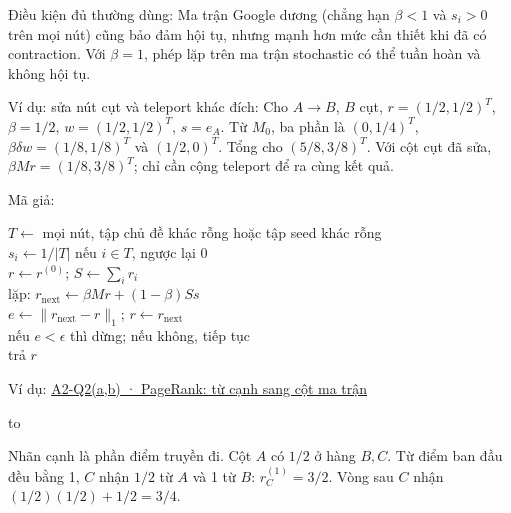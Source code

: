 \documentclass[10pt,a4paper,twocolumn]{article}
\makeatletter
\newcommand{\key}[1]{#1:\enspace}
\newcommand{\blocklabel}[1]{\par\noindent#1\par\nobreak}
\newcommand{\qlink}[2]{\hyperref[question:#1]{#2}}
\newenvironment{example}[2]{%
  \par\addvspace{6pt}\noindent
  \raggedright
  \blocklabel{Ví dụ: \qlink{#1}{#2}}%
}{\par\addvspace{4pt}}
\newenvironment{diagram}{%
  \par\addvspace{3pt}\noindent\hbox to \linewidth\bgroup\hfil
}{\hfil\egroup\par\addvspace{3pt}}
\newenvironment{algpseudo}{%
  \par\addvspace{2pt}\noindent
  \setlength{\parskip}{0pt}%
  Mã giả:\par\nobreak
  \begin{list}{}{\setlength{\leftmargin}{1em}\setlength{\topsep}{0pt}%
    \setlength{\partopsep}{0pt}\setlength{\parsep}{0pt}%
    \@beginparpenalty=10000\relax}%
  \item\relax
}{\end{list}\par\addvspace{3pt}}
\makeatother
\begin{document}
\key{Điều kiện đủ thường dùng} Ma trận Google dương (chẳng hạn $\beta<1$ và $s_i>0$ trên mọi nút) cũng bảo đảm hội tụ, nhưng mạnh hơn mức cần thiết khi đã có contraction. Với $\beta=1$, phép lặp trên ma trận stochastic có thể tuần hoàn và không hội tụ.

\key{Ví dụ: sửa nút cụt và teleport khác đích} Cho $A\to B$, $B$ cụt, $r=(1/2,1/2)^T$, $\beta=1/2$, $w=(1/2,1/2)^T$, $s=e_A$. Từ $M_0$, ba phần là $(0,1/4)^T$, $\beta\delta w=(1/8,1/8)^T$ và $(1/2,0)^T$. Tổng cho $(5/8,3/8)^T$. Với cột cụt đã sửa, $\beta Mr=(1/8,3/8)^T$; chỉ cần cộng teleport để ra cùng kết quả.

\begin{algpseudo}
$T\gets$ mọi nút, tập chủ đề khác rỗng hoặc tập seed khác rỗng\\
$s_i\gets1/|T|$ nếu $i\in T$, ngược lại $0$\\
$r\gets r^{(0)}$; $S\gets\sum_i r_i$\\
lặp: $r_{\mathrm{next}}\gets\beta Mr+(1-\beta)S s$\\
$e\gets\|r_{\mathrm{next}}-r\|_1$; $r\gets r_{\mathrm{next}}$\\
nếu $e<\epsilon$ thì dừng; nếu không, tiếp tục\\
trả $r$
\end{algpseudo}

\begin{example}{A2-Q2}{A2-Q2(a,b) · PageRank: từ cạnh sang cột ma trận}
\begin{diagram}
\end{diagram}
Nhãn cạnh là phần điểm truyền đi. Cột $A$ có $1/2$ ở hàng $B,C$. Từ điểm ban đầu đều bằng 1, $C$ nhận $1/2$ từ $A$ và 1 từ $B$: $r_C^{(1)}=3/2$. Vòng sau $C$ nhận $(1/2)(1/2)+1/2=3/4$.
\end{example}
\end{document}
